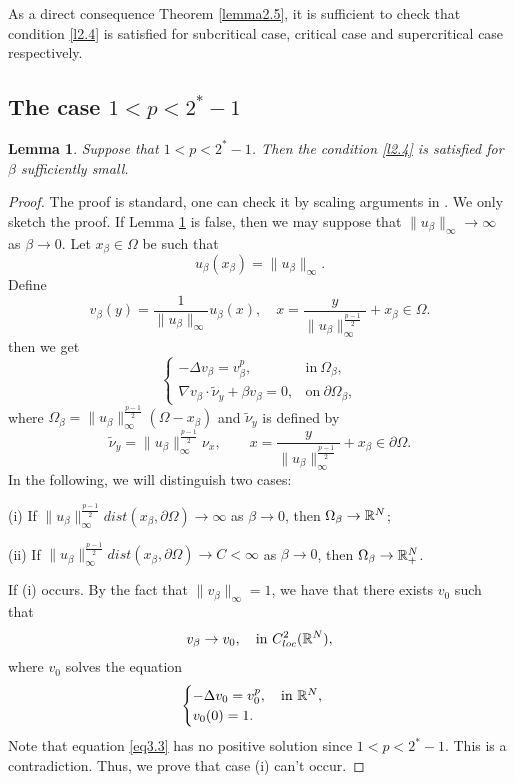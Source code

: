 \documentclass[12pt,reqno]{amsart}
\numberwithin{equation}{section}
\newtheorem{lemma}[theorem]{Lemma}
\theoremstyle{definition}
\def\R{{\Bbb R}}
\begin{document}
As a direct consequence Theorem \ref{lemma2.5}, it is sufficient to check that condition \eqref{l2.4} is satisfied for subcritical case, critical case and supercritical case respectively.





\subsection{The case $1<p<2^*-1$} 


\begin{lemma}\label{lemma2.7}
Suppose that $1<p<2^*-1$. Then  the condition \eqref{l2.4} is satisfied for $\beta$ sufficiently small.
\end{lemma}


\begin{proof}
The proof is standard, one can check it by scaling arguments in \cite{GS1}. We only sketch the proof.  If Lemma \ref{lemma2.7} is false,  then we may suppose that $\|u_\beta\|_\infty\to \infty$ as $\beta\to 0$.  Let $x_\beta\in \Omega$ be such that 
$$
u_\beta(x_\beta)=\|u_\beta\|_{\infty}.
$$
Define
\begin{equation*}
v_\beta(y)=\frac{1}{\|u_\beta\|_\infty}u_\beta(x),\quad x=\frac{y}{\|u_\beta\|_\infty^{\frac{p-1}{2}}}+x_\beta\in\Omega.
\end{equation*}
then we get 
\begin{equation*}
\begin{cases}
-\Delta v_\beta=v_\beta^p,\quad &\text{in}\ \Omega_\beta,\\
\nabla v_\beta\cdot \tilde{\nu}_y+\beta v_\beta=0, &\text{on}\ \partial\Omega_\beta,
\end{cases}
\end{equation*}
where $\Omega_\beta=\|u_\beta\|_\infty^{\frac{p-1}{2}}(\Omega-x_\beta)$ and $\tilde{\nu}_y$ is defined by  
$$
\tilde{\nu}_y=\|u_\beta\|_\infty^{\frac{p-1}{2}}\nu_x,\qquad x=\frac{y}{\|u_\beta\|_\infty^{\frac{p-1}{2}}}+x_\beta\in\partial\Omega.
$$
In the following, we will distinguish two cases:

(i) If $\|u_\beta\|^{\frac{p-1}{2}}_\infty dist(x_\beta,\partial\Omega)\to \infty$ as $\beta\to 0$, then $\Omega_\beta\to \R^N$;

(ii) If $\|u_\beta\|^{\frac{p-1}{2}}_\infty dist(x_\beta,\partial\Omega)\to C<\infty$ as $\beta\to 0$, then $\Omega_\beta\to \R_+^N$.

If (i) occurs. By the fact that $\|v_\beta\|_\infty=1$,  we have that there exists $v_0$ such that 
$$
v_\beta\to v_0,\quad \text{in}\ C^2_{loc}(\R^N),
$$
where $v_0$ solves the equation
\begin{equation}\label{eq3.3}
\begin{cases}
-\Delta v_0=v_0^p,\quad \text{in}\ \R^N,\\
v_0(0)=1.
\end{cases}
\end{equation}
Note that equation \eqref{eq3.3} has no positive solution since $1<p<2^*-1$. This is a contradiction. Thus, we prove that case (i) can't occur.


\end{proof}
\end{document}
